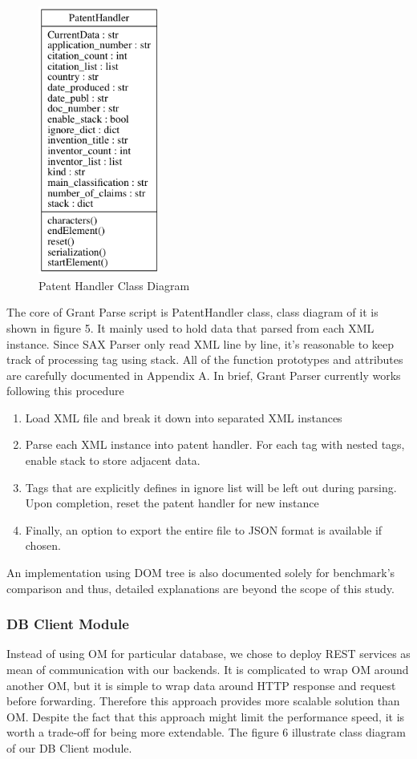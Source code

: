 \documentclass{sig-alternate}
\begin{document}
{\begin{figure}[htb]
\centering
\includegraphics[width=40mm,scale=10]{handler.png}
\caption{ Patent Handler Class Diagram}
\end{figure}

The core of Grant Parse script is PatentHandler class, class diagram of it is shown in figure 5. It mainly used to hold data that parsed from each XML instance. Since SAX Parser only read XML line by line, it's reasonable to keep track of processing tag using stack. All of the function prototypes and attributes are carefully documented in Appendix A. In brief, Grant Parser currently works following this procedure
\begin{enumerate}
 \item Load XML file and break it down into separated XML instances
 \item Parse each XML instance into patent handler. For each tag with nested tags, enable stack to store adjacent data.
 \item Tags that are explicitly defines in ignore list will be left out during parsing. Upon completion, reset the patent handler for new instance
 \item Finally, an option to export the entire file to JSON format is available if chosen.
\end{enumerate}

An implementation using DOM tree is also documented solely for benchmark's comparison and thus, detailed explanations are beyond the scope of this study.

\subsubsection{DB Client Module}
Instead of using OM for particular database, we chose to deploy REST services as mean of communication with our backends. It is complicated to wrap OM around another OM, but it is simple to wrap data around HTTP response and request before forwarding. Therefore this approach provides more scalable solution than OM. Despite the fact that this approach might limit the performance speed, it is worth a trade-off for being more extendable. The figure 6 illustrate class diagram of our DB Client module.

}
\end{document}
